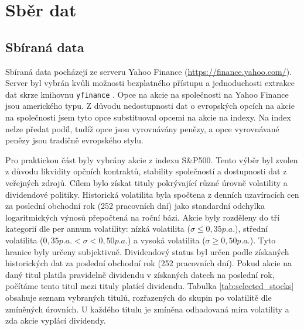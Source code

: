 \documentclass[male,czech,api_bc]{kitheses}
\begin{document}
  \section{Sběr dat}

  \subsection{Sbíraná data}

  Sbíraná data pocházejí ze serveru Yahoo Finance (\url{https://finance.yahoo.com/}). Server byl vybrán kvůli možnosti bezplatného přístupu a jednoduchosti extrakce dat skrze knihovnu \texttt{yfinance} \parencites{yfinance}. 
  Opce na akcie na společnosti na Yahoo Finance jsou amerického typu. Z důvodu nedostupnosti dat o evropských opcích na akcie na společnosti jsem tyto opce substituoval opcemi na akcie na indexy. Na index nelze předat podíl, tudíž opce jsou vyrovnávány penězy, a opce vyrovnávané penězy jsou tradičně evropského stylu.

  Pro praktickou část byly vybrány akcie z indexu S\&P500. Tento výběr byl zvolen z důvodu likvidity opčních kontraktů, stability společností a dostupnosti dat z veřejných zdrojů. Cílem bylo získat tituly pokrývající různé úrovně volatility a dividendové politiky.
 Historická volatilita byla spočtena z denních uzavíracích cen za poslední obchodní rok (252 pracovních dní) jako standardní odchylka logaritmických výnosů přepočtená na roční bázi. Akcie byly rozděleny do tří kategorií dle per annum volatility: nízká volatilita (\(\sigma \le 0{,}35 p.a.\)), střední volatilita (\(0{,}35 p.a. < \sigma < 0{,}50 p.a.\)) a vysoká volatilita (\(\sigma \ge 0{,}50 p.a.\)). Tyto hranice byly určeny subjektivně. Dividendový status byl určen podle získaných historických dat za poslední obchodní rok (252 pracovních dní). Pokud akcie na daný titul platila pravidelně dividendu v získaných datech na poslední rok, počítáme tento titul mezi tituly platící dividendu.
 Tabulka \ref{tab:selected_stocks} obsahuje seznam vybraných titulů, rozřazených do skupin po volatilitě dle zmíněných úrovních. U každého titulu je zmíněna odhadovaná míra volatility a zda akcie vyplácí dividendy.
\end{document}
